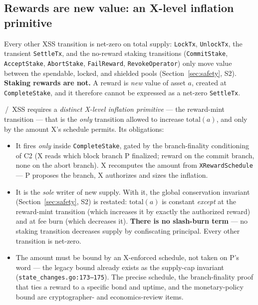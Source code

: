 \subsection{Rewards are new value: an X-level inflation primitive}
\label{sec:rewardinflation}

Every other XSS transition is net-zero on total supply: \texttt{LockTx},
\texttt{UnlockTx}, the transient \texttt{SettleTx}, and the no-reward
staking transitions (\texttt{CommitStake}, \texttt{AcceptStake},
\texttt{AbortStake}, \texttt{FailReward}, \texttt{RevokeOperator}) only
move value between the spendable, locked, and shielded pools
(Section~\ref{sec:safety}, S2). \textbf{Staking rewards are not.} A
reward is \emph{new} value of asset $a$, created at \texttt{CompleteStake},
and it therefore cannot be expressed as a net-zero \texttt{SettleTx}.

\CRYPTO{}\,/\,\DESIGN{} XSS requires a \emph{distinct X-level inflation
primitive} --- the reward-mint transition --- that is the \emph{only}
transition allowed to increase $\mathrm{total}(a)$, and only by the
amount X's schedule permits. Its obligations:

\begin{itemize}[leftmargin=2em,nosep]
\item It fires \emph{only} inside \texttt{CompleteStake}, gated by the
  branch-finality conditioning of C2 (X reads which block branch P
  finalized; reward on the commit branch, none on the abort branch). X
  recomputes the amount from \texttt{XRewardSchedule} --- P proposes the
  branch, X authorizes and sizes the inflation.
\item It is the \emph{sole} writer of new supply. With it, the global
  conservation invariant (Section~\ref{sec:safety}, S2) is restated:
  $\mathrm{total}(a)$ is constant \emph{except} at the reward-mint
  transition (which increases it by exactly the authorized reward) and at
  fee burn (which decreases it). \textbf{There is no slash-burn term} ---
  no staking transition decreases supply by confiscating principal. Every
  other transition is net-zero.
\item The amount must be bound by an X-enforced schedule, not taken on
  P's word --- the legacy bound already exists as the supply-cap
  invariant (\texttt{state\_changes.go:173--175}). The precise schedule,
  the branch-finality proof that ties a reward to a specific bond and
  uptime, and the monetary-policy bound are cryptographer- and
  economics-review items.
\end{itemize}


